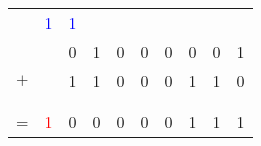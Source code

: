 \documentclass[10pt]{beamer}
\begin{document}
\begin{frame}
	\mframe{\Schema}
	\begin{tabular}{cccccccccc}
		                & \textcolor{blue}{\small 1} & \textcolor{blue}{\small 1}  &   &   &   &   &   &   &   \\
		                &  & 0 & 1 & 0 & 0 & 0 & 0 & 0 & 1 \\
		$+$             &  & 1 & 1 & 0 & 0 & 0 & 1 & 1 & 0 \\
		\vspace{-0.3cm} &  &   &   &   &   &   &   &   &   \\
		\hline
		\vspace{-0.3cm} &  &   &   &   &   &   &   &   &   \\
		=               & \textcolor{red}{\small 1} & 0 & 0 & 0 & 0 & 0 & 1 & 1 & 1 \\
	\end{tabular}
\end{frame}
\end{document}
